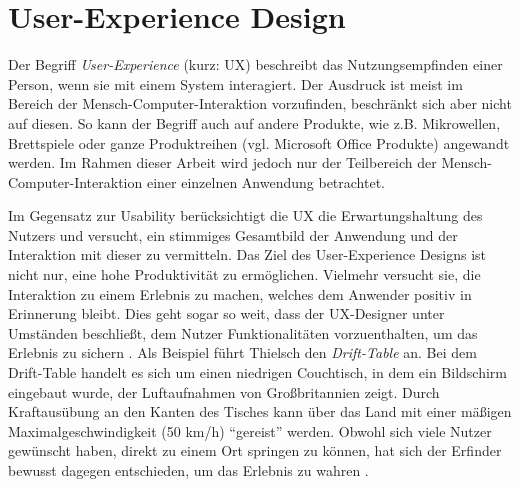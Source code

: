 \section{User-Experience Design} \label{sec:uxd}
Der Begriff \textit{User-Experience} (kurz: UX) beschreibt das Nutzungsempfinden einer Person, wenn sie mit einem System interagiert. Der Ausdruck ist meist im Bereich der Mensch-Computer-Interaktion vorzufinden, beschränkt sich aber nicht auf diesen.\newline\cite{Gube2010} So kann der Begriff auch auf andere Produkte, wie z.B. Mikrowellen, Brettspiele oder ganze Produktreihen (vgl. Microsoft Office Produkte) angewandt werden. Im Rahmen dieser Arbeit wird jedoch nur der Teilbereich der Mensch-Computer-Interaktion einer einzelnen Anwendung betrachtet. \par
Im Gegensatz zur Usability berücksichtigt die UX die Erwartungshaltung des Nutzers und versucht, ein stimmiges Gesamtbild der Anwendung und der Interaktion mit dieser zu vermitteln. Das Ziel des User-Experience Designs ist nicht nur, eine hohe Produktivität zu ermöglichen. Vielmehr versucht sie, die Interaktion zu einem Erlebnis zu machen, welches dem Anwender positiv in Erinnerung bleibt. Dies geht sogar so weit, dass der UX-Designer unter Umständen beschließt, dem Nutzer Funktionalitäten vorzuenthalten, um das Erlebnis zu sichern \cite{Thielsch2015}. Als Beispiel führt Thielsch den \textit{Drift-Table} an. Bei dem Drift-Table handelt es sich um einen niedrigen Couchtisch, in dem ein Bildschirm eingebaut wurde, der Luftaufnahmen von Großbritannien zeigt. Durch Kraftausübung an den Kanten des Tisches kann über das Land mit einer mäßigen Maximalgeschwindigkeit (50 km/h) \enquote{gereist} werden. Obwohl sich viele Nutzer gewünscht haben, direkt zu einem Ort springen zu können, hat sich der Erfinder bewusst dagegen entschieden, um das Erlebnis zu wahren \cite{Thielsch2015}.\par
